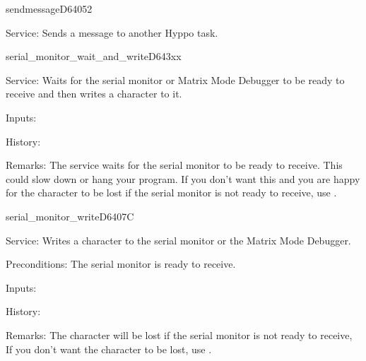 \newpage
\begin{hyppotrap}{sendmessage}{D640}{52}
\item [Service:]
  Sends a message to another Hyppo task.
\notimplemented
\end{hyppotrap}


\newpage
\begin{hyppotrap}{serial\_monitor\_wait\_and\_write}{D643}{xx}
\item [Service:]
  Waits for the serial monitor or Matrix Mode Debugger to be ready to receive
  and then writes a character to it.
\item [Inputs:]
\item [History:]
\item [Remarks:]
  The service waits for the serial monitor to be ready to receive. This could
  slow down or hang your program. If you don't want this and you are happy for
  the character to be lost if the serial monitor is not ready to receive,
  use .
\end{hyppotrap}


\newpage
\begin{hyppotrap}{serial\_monitor\_write}{D640}{7C}
\item [Service:]
  Writes a character to the serial monitor or the Matrix Mode Debugger.
\item [Preconditions:]
  The serial monitor is ready to receive.
\item [Inputs:]
\item [History:]
\item [Remarks:]
  The character will be lost if the serial monitor is not ready to receive,
  If you don't want the character to be lost, use
  .
\end{hyppotrap}


